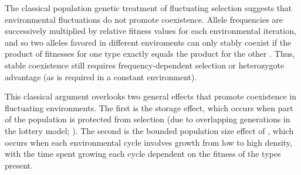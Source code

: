 \documentclass[11pt]{article}
\begin{document}
The classical population genetic treatment of fluctuating selection suggests that environmental fluctuations do not promote coexistence. Allele frequencies are successively multiplied by relative fitness values for each environmental iteration, and so two alleles favored in different enviroments can only stably coexist if the product of fitnesses for one type exactly equals the product for the other \citep{dempster_1955}. Thus, stable coexistence still requires frequency-dependent selection or heterozygote advantage (as is required in a constant environment). 

This classical argument overlooks two general effects that promote coexistence in fluctuating environments. The first is the storage effect, which occurs when part of the population is protected from selection (due to overlapping generations in the lottery model; \citealt{chesson_1981}). The second is the  bounded population size effect of \cite{yi_2013}, which occurs when each environmental cycle involves growth from low to high density, with the time spent growing each cycle dependent on the fitness of the types present.


\end{document}
